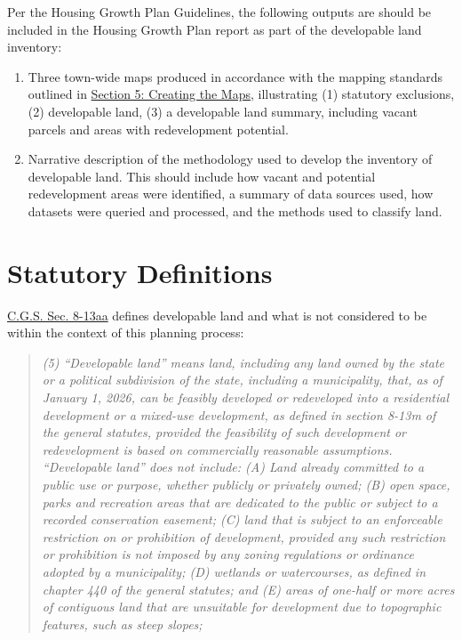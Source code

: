 \documentclass[
  letterpaper,
  DIV=11,
  numbers=noendperiod]{scrreprt}
\begin{document}
Per the Housing Growth Plan Guidelines, the following outputs are should
be included in the Housing Growth Plan report as part of the developable
land inventory:

\begin{enumerate}
\def\labelenumi{\arabic{enumi}.}
\item
  Three town-wide maps produced in accordance with the mapping standards
  outlined in \href{map.qmd}{Section 5: Creating the Maps}, illustrating
  (1) statutory exclusions, (2) developable land, (3) a developable land
  summary, including vacant parcels and areas with redevelopment
  potential.
\item
  Narrative description of the methodology used to develop the inventory
  of developable land. This should include how vacant and potential
  redevelopment areas were identified, a summary of data sources used,
  how datasets were queried and processed, and the methods used to
  classify land.
\end{enumerate}


\chapter{Statutory Definitions}\label{sec-statutory-exclusions}

\href{https://cga.ct.gov/2026/sup/chap_124b.htm\#sec_8-13aa}{C.G.S. Sec.
8-13aa} defines developable land and what is not considered to be within
the context of this planning process:

\begin{quote}
\emph{(5) ``Developable land'' means land, including any land owned by
the state or a political subdivision of the state, including a
municipality, that, as of January 1, 2026, can be feasibly developed or
redeveloped into a residential development or a mixed-use development,
as defined in section 8-13m of the general statutes, provided the
feasibility of such development or redevelopment is based on
commercially reasonable assumptions. ``Developable land'' does not
include: (A) Land already committed to a public use or purpose, whether
publicly or privately owned; (B) open space, parks and recreation areas
that are dedicated to the public or subject to a recorded conservation
easement; (C) land that is subject to an enforceable restriction on or
prohibition of development, provided any such restriction or prohibition
is not imposed by any zoning regulations or ordinance adopted by a
municipality; (D) wetlands or watercourses, as defined in chapter 440 of
the general statutes; and (E) areas of one-half or more acres of
contiguous land that are unsuitable for development due to topographic
features, such as steep slopes;}
\end{quote}
\end{document}
